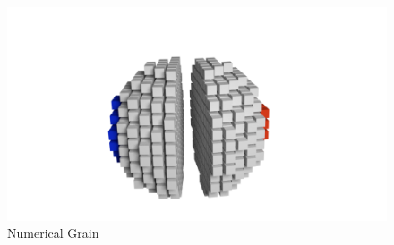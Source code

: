 \documentclass[11pt]{article}
\begin{document}
\begin{figure}
\centering
\includegraphics{media/pics/sliced_cube.png}
\caption{Numerical Grain}
\end{figure}
\end{document}
